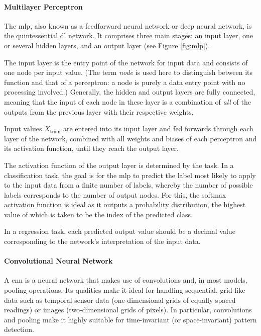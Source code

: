 \paragraph*{Multilayer Perceptron}
The \ac{mlp}, also known as a feedforward neural network or deep neural network, is the quintessential \ac{dl} network. It comprises three main stages: an input layer, one or several hidden layers, and an output layer (see Figure \ref{fig:mlp}).



The input layer is the entry point of the network for input data and consists of one node per input value. (The term \textit{node} is used here to distinguish between its function and that of a perceptron: a node is purely a data entry point with no processing involved.) Generally, the hidden and output layers are fully connected, meaning that the input of each node in these layer is a combination of \textit{all} of the outputs from the previous layer with their respective weights.

Input values \(X_{\text{train}}\) are entered into its input layer and fed forwards through each layer of the network, combined with all weights and biases of each perceptron and its activation function, until they reach the output layer.

The activation function of the output layer is determined by the task. In a classification task, the goal is for the \ac{mlp} to predict the label most likely to apply to the input data from a finite number of labels, whereby the number of possible labels corresponds to the number of output nodes. For this, the softmax activation function is ideal \cite[p. 184]{goodfellow_deep_2016} as it outputs a probability distribution, the highest value of which is taken to be the index of the predicted class.

In a regression task, each predicted output value should be a decimal value corresponding to the network's interpretation of the input data.

\paragraph*{Convolutional Neural Network}
A \ac{cnn} is a neural network that makes use of convolutions and, in most models, pooling operations. Its qualities make it ideal for handling sequential, grid-like data such as temporal sensor data (one-dimensional grids of equally spaced readings) or images (two-dimensional grids of pixels). In particular, convolutions and pooling make it highly suitable for time-invariant (or space-invariant) pattern detection. \cite[]{goodfellow_deep_2016}

